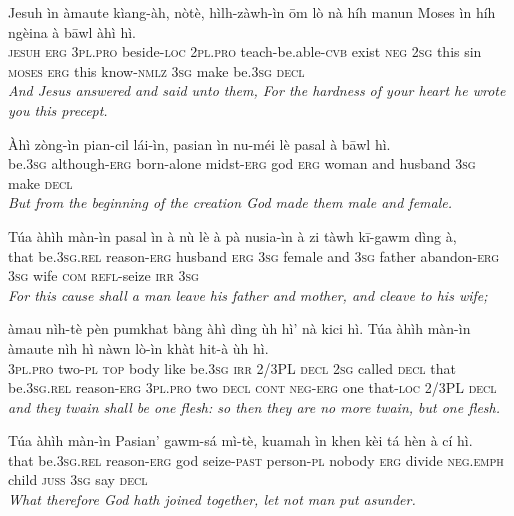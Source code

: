 \documentclass[11pt,a4paper]{article}
\begin{document}
\begin{exe}
\gll Jesuh ìn àmaute kìang-àh, nòtè, hìlh-zàwh-ìn ōm lò nà híh manun Moses ìn híh ngèina à bāwl àhì hì. \\
     \textsc{jesuh} \textsc{erg} \textsc{3pl}.\textsc{pro} beside-\textsc{loc} \textsc{2pl}.\textsc{pro} teach-be.able-\textsc{cvb} exist \textsc{neg} \textsc{2sg} this sin \textsc{moses} \textsc{erg} this know-\textsc{nmlz} \textsc{3sg} make be.\textsc{3sg} \textsc{decl} \\
\glt \textcolor{kjvcolor}{\textit{And Jesus answered and said unto them, For the hardness of your heart he wrote you this precept.}}

\gll Àhì zòng-ìn pian-cil lái-ìn, pasian ìn nu-méi lè pasal à bāwl hì. \\
     be.\textsc{3sg} although-\textsc{erg} born-alone midst-\textsc{erg} god \textsc{erg} woman and husband \textsc{3sg} make \textsc{decl} \\
\glt \textcolor{kjvcolor}{\textit{But from the beginning of the creation God made them male and female.}}

\gll Túa àhìh màn-ìn pasal ìn à nù lè à pà nusia-ìn à zi tàwh kī-gawm dìng à, \\
     that be.\textsc{3sg}.\textsc{rel} reason-\textsc{erg} husband \textsc{erg} \textsc{3sg} female and \textsc{3sg} father abandon-\textsc{erg} \textsc{3sg} wife \textsc{com} \textsc{refl}-seize \textsc{irr} \textsc{3sg} \\
\glt \textcolor{kjvcolor}{\textit{For this cause shall a man leave his father and mother, and cleave to his wife;}}

\gll àmau nìh-tè pèn pumkhat bàng àhì dìng ùh hì' nà kici hì. Túa àhìh màn-ìn àmaute nìh hì nàwn lò-ìn khàt hit-à ùh hì. \\
     \textsc{3pl}.\textsc{pro} two-\textsc{pl} \textsc{top} body like be.\textsc{3sg} \textsc{irr} 2/3PL \textsc{decl} \textsc{2sg} called \textsc{decl} that be.\textsc{3sg}.\textsc{rel} reason-\textsc{erg} \textsc{3pl}.\textsc{pro} two \textsc{decl} \textsc{cont} \textsc{neg}-\textsc{erg} one that-\textsc{loc} 2/3PL \textsc{decl} \\
\glt \textcolor{kjvcolor}{\textit{and they twain shall be one flesh: so then they are no more twain, but one flesh.}}

\gll Túa àhìh màn-ìn Pasian' gawm-sá mì-tè, kuamah ìn khen kèi tá hèn à cí hì. \\
     that be.\textsc{3sg}.\textsc{rel} reason-\textsc{erg} god seize-\textsc{past} person-\textsc{pl} nobody \textsc{erg} divide \textsc{neg}.\textsc{emph} child \textsc{juss} \textsc{3sg} say \textsc{decl} \\
\glt \textcolor{kjvcolor}{\textit{What therefore God hath joined together, let not man put asunder.}}


\end{exe}
\end{document}
